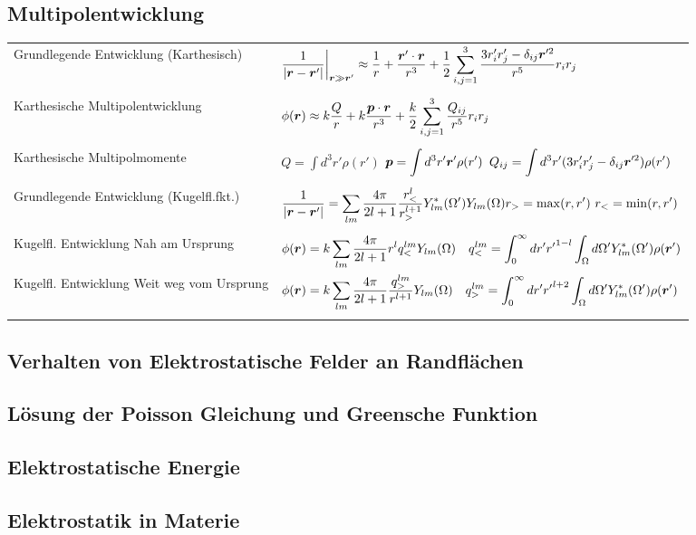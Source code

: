 \subsection{Multipolentwicklung}%
  \noindent
  \begin{tabular}{p{4.5cm}p{12cm}}
    Grundlegende Entwicklung (Karthesisch)
    & 
    \(\displaystyle
      \frac{1}{\abs{\vb*r-\vb*r'}}\bigg|_{\vb*r\gg\vb*r'} 
      \approx \frac{1}{r} + \frac{\vb*r'\cdot\vb*r}{r^3} + \frac{1}{2}
      \sum_{i,j=1}^{3} \frac{3r_i'r_j'-\delta_{ij}\vb*r'^2}{r^5}r_ir_j 
    \)\\\\
    Karthesische Multipolentwicklung
    & 
    \(\displaystyle
    \phi(\vb*r)
    \approx k\frac{Q}{r} + k\frac{\vb*p\cdot\vb*r}{r^3} + \frac{k}{2}
    \sum_{i,j=1}^{3} \frac{Q_{ij}}{r^5}r_ir_j 
    \)\\\\
    Karthesische Multipolmomente
    &
    \(\displaystyle
      Q = \int d^3r' \rho(r')
    \)\newline
    \(\displaystyle
      \vb*p = \int d^3r'\vb*r' \rho(r')
    \)\newline
    \(\displaystyle
      Q_{ij} = \int d^3r'(3r_i'r_j'-\delta_{ij}\vb*r'^2) \rho(r')
    \)\\\\
    Grundlegende Entwicklung (Kugelfl.fkt.)
    &
    \(\displaystyle
    \frac{1}{\abs{\vb*r-\vb*r'}}
    =
    \sum_{lm} \frac{4\pi}{2l+1} \frac{r_<^l}{r_>^{l+1}}
    Y^*_{lm}(\Omega')Y_{lm}(\Omega)\newline r_>=\max(r,r')\ r_<=\min(r,r')
    \)\\\\
    Kugelfl. Entwicklung Nah am Ursprung
    &
    \(\displaystyle
    \phi(\vb*r) 
    = k\sum_{lm} \frac{4\pi}{2l+1}r^l q_<^{lm} Y_{lm}(\Omega) 
    \quad q_<^{lm}=\int_0^\infty dr' {r'}^{1-l}
  \int_\Omega d\Omega' Y^*_{lm}(\Omega')\rho(\vb*r')
    \)\\
    Kugelfl. Entwicklung Weit weg vom Ursprung
    &
    \(\displaystyle
    \phi(\vb*r) 
    = k\sum_{lm} \frac{4\pi}{2l+1} 
    \frac{q_>^{lm}}{r^{l+1}} Y_{lm}(\Omega)\quad
    q_>^{lm}=\int_0^\infty dr' {r'}^{l+2}
    \int_\Omega d\Omega' Y^*_{lm}(\Omega')\rho(\vb*r')
    \)\\\\
  \end{tabular}
   
  \noindent
  

\subsection{Verhalten von Elektrostatische Felder an Randflächen}%

\subsection{Lösung der Poisson Gleichung und Greensche Funktion}%

\subsection{Elektrostatische Energie}%

\subsection{Elektrostatik in Materie}%
